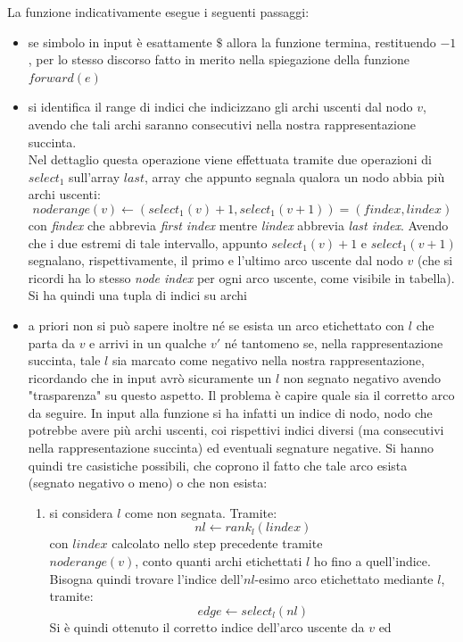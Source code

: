 \documentclass[a4paper,12pt, oneside]{book}
\begin{document}
La funzione indicativamente esegue i seguenti passaggi:
\begin{itemize}
  \item se simbolo in input è esattamente $\$$ allora la funzione termina,
  restituendo $-1$, per lo stesso discorso fatto in merito nella spiegazione
  della funzione $forward(e)$
  \item si identifica il range di indici che indicizzano gli archi uscenti dal
  nodo $v$, avendo che tali archi saranno consecutivi nella nostra
  rappresentazione succinta.\\
  Nel dettaglio questa operazione viene effettuata tramite due operazioni di
  $select_1$ sull'array $last$, array che appunto segnala qualora un nodo abbia
  più archi uscenti:
  \[noderange(v)\gets(select_1(v)+1, select_1(v+1))=(findex, lindex)\]
  con \textit{findex} che abbrevia \textit{first index} mentre \textit{lindex}
  abbrevia \textit{last index}.
  Avendo che i due estremi di tale intervallo, appunto $select_1(v)+1$ e
  $select_1(v+1)$ segnalano, rispettivamente, il primo e l'ultimo arco uscente
  dal nodo $v$ (che si ricordi ha lo stesso \textit{node index} per ogni arco
  uscente, come visibile in tabella). Si ha quindi una tupla di indici su archi
  \item a priori non si può sapere inoltre né se esista un arco etichettato con
  $l$ che parta da $v$ e arrivi in un qualche $v'$ né tantomeno se, nella
  rappresentazione succinta, tale $l$ sia marcato come negativo nella nostra
  rappresentazione, ricordando che in input avrò sicuramente un $l$ non segnato
  negativo avendo "trasparenza" su questo aspetto. Il problema è 
  capire quale sia il corretto arco da seguire. In input alla funzione si ha
  infatti un indice di nodo, nodo che potrebbe avere più archi uscenti, coi
  rispettivi indici diversi (ma consecutivi nella rappresentazione succinta) ed
  eventuali segnature negative. Si hanno quindi tre casistiche possibili, che
  coprono il fatto che tale arco esista (segnato negativo o meno) o che non
  esista: 
  \begin{enumerate}
    \item si considera $l$ come non segnata. Tramite:
    \[nl\gets rank_l(lindex)\]
    con $lindex$ calcolato nello step precedente tramite\\ $noderange(v)$, conto
    quanti archi 
    etichettati $l$ ho fino a quell'indice. Bisogna quindi trovare l'indice
    dell'$nl$-esimo arco etichettato mediante $l$, tramite:
    \[edge \gets select_l(nl)\]
    Si è quindi ottenuto il corretto indice dell'arco uscente da $v$ ed

\end{enumerate}
\end{itemize}
\end{document}
